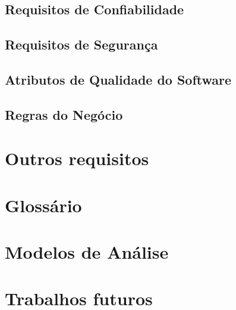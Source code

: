 \section{Requisitos de Confiabilidade}
\section{Requisitos de Segurança}
\section{Atributos de Qualidade do Software}
\section{Regras do Negócio}

\chapter{Outros requisitos}
\label{Outros requisitos}


\begin{appendix}
\chapter{Glossário}
\chapter{Modelos de Análise}
\chapter{Trabalhos futuros}
\end{appendix}



